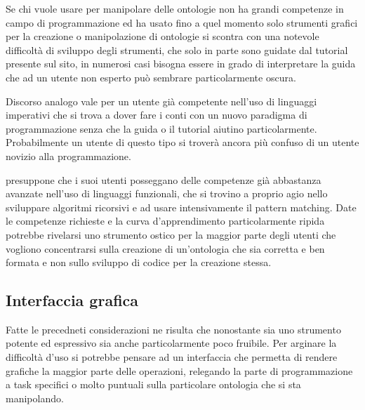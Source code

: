 Se chi vuole usare \cduce per manipolare delle ontologie non ha grandi competenze in campo di programmazione ed ha usato fino a quel momento solo strumenti grafici per la creazione o manipolazione di ontologie si scontra con una notevole difficoltà di sviluppo degli strumenti, che solo in parte sono guidate dal tutorial presente sul sito, in numerosi casi bisogna essere in grado di interpretare la guida che ad un utente non esperto può sembrare particolarmente oscura.

Discorso analogo vale per un utente già competente nell'uso di linguaggi imperativi che si trova a dover fare i conti con un nuovo paradigma di programmazione senza che la guida o il tutorial aiutino particolarmente. Probabilmente un utente di questo tipo si troverà ancora più confuso di un utente novizio alla programmazione.

\cduce presuppone che i suoi utenti posseggano delle competenze già abbastanza avanzate nell'uso di linguaggi funzionali, che si trovino a proprio agio nello sviluppare algoritmi ricorsivi e ad usare intensivamente il pattern matching. Date le competenze richieste e la curva d'apprendimento particolarmente ripida \cduce potrebbe rivelarsi uno strumento ostico per la maggior parte degli utenti che vogliono concentrarsi sulla creazione di un'ontologia che sia corretta e ben formata e non sullo sviluppo di codice per la creazione stessa.

\subsection{Interfaccia grafica}\label{ch5.4}
Fatte le precedneti considerazioni ne risulta che nonostante \cduce sia uno strumento potente ed espressivo sia anche particolarmente poco fruibile. Per arginare la difficoltà d'uso si potrebbe pensare ad un interfaccia che permetta di rendere grafiche la maggior parte delle operazioni, relegando la parte di programmazione a task specifici o molto puntuali sulla particolare ontologia che si sta manipolando.

